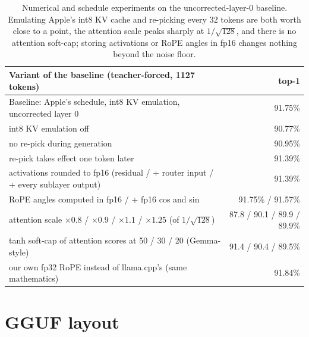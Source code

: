 \documentclass[11pt,reqno]{amsart}
\theoremstyle{definition}
\begin{document}
\begin{table}[H]
\centering\footnotesize
\begin{tabular}{@{}lr@{}}
\toprule
Variant of the baseline (teacher-forced, 1127 tokens) & top-1 \\
\midrule
Baseline: Apple's schedule, int8 KV emulation, uncorrected layer 0 & 91.75\% \\
int8 KV emulation off & 90.77\% \\
no re-pick during generation & 90.95\% \\
re-pick takes effect one token later & 91.39\% \\
activations rounded to fp16 (residual / + router input / + every sublayer output) & 91.39\% \\
RoPE angles computed in fp16 / + fp16 cos and sin & 91.75\% / 91.57\% \\
attention scale $\times0.8$ / $\times0.9$ / $\times1.1$ / $\times1.25$ (of $1/\sqrt{128}$) & 87.8 / 90.1 / 89.9 / 89.9\% \\
tanh soft-cap of attention scores at 50 / 30 / 20 (Gemma-style) & 91.4 / 90.4 / 89.5\% \\
our own fp32 RoPE instead of llama.cpp's (same mathematics) & 91.84\% \\
\bottomrule
\end{tabular}
\caption{Numerical and schedule experiments on the uncorrected-layer-0 baseline. Emulating Apple's int8 KV cache and re-picking every 32 tokens are both worth close to a point, the attention scale peaks sharply at $1/\sqrt{128}$, and there is no attention soft-cap; storing activations or RoPE angles in fp16 changes nothing beyond the noise floor.}\label{tab:night}
\end{table}

\section{GGUF layout}\label{sec:gguf}
\end{document}
